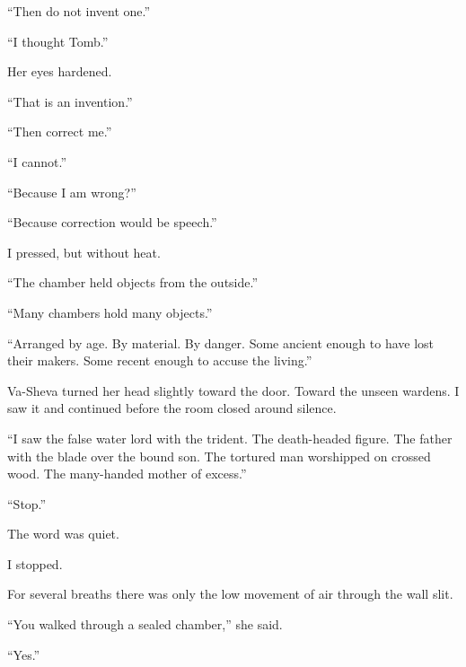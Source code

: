 ``Then do not invent one.''\par

``I thought Tomb.''\par

Her eyes hardened.\par

``That is an invention.''\par

``Then correct me.''\par

``I cannot.''\par

``Because I am wrong?''\par

``Because correction would be speech.''\par

I pressed, but without heat.\par

``The chamber held objects from the outside.''\par

``Many chambers hold many objects.''\par

``Arranged by age. By material. By danger. Some ancient enough to have lost their makers. Some recent enough to accuse the living.''\par

Va-Sheva turned her head slightly toward the door. Toward the unseen wardens. I saw it and continued before the room closed around silence.\par

``I saw the false water lord with the trident. The death-headed figure. The father with the blade over the bound son. The tortured man worshipped on crossed wood. The many-handed mother of excess.''\par

``Stop.''\par

The word was quiet.\par

I stopped.\par

For several breaths there was only the low movement of air through the wall slit.\par

``You walked through a sealed chamber,'' she said.\par

``Yes.''\par

